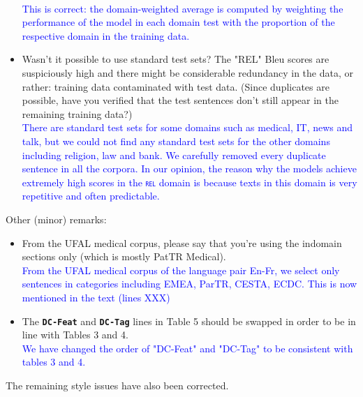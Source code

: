 \documentclass[12pt,times,a4paper,twoside]{article}
\newcommand{\fyTodo}[1]{\Todo[FY:]{\textcolor{orange}{#1}}}
\theoremstyle{definition}
\newcommand{\domain}[1]{\texttt{\textsc{#1}}}
\newcommand{\system}[1]{\texttt{\textbf{#1}}}
\begin{document}
\begin{itemize}
\\
\textcolor{blue}{This is correct: the domain-weighted average is computed by weighting the performance of the model in each domain test with the proportion of the respective domain in the training data.}
\\
\item Wasn't it possible to use standard test sets? The "REL" Bleu scores are suspiciously high and there might be considerable redundancy in the data, or rather: training data contaminated with test data. (Since duplicates are possible, have you verified that the test sentences don't still appear in the remaining training data?)
\\
\textcolor{blue}{There are standard test sets for some domains such as medical, IT, news and talk, but we could not find any standard test sets for the other domains including religion, law and bank. We carefully removed every duplicate sentence in all the corpora. In our opinion, the reason why the models achieve extremely high scores in the \domain{rel} domain is because texts in this domain is very repetitive and often predictable.}\fyTodo{sentence length ?, diversity index of vocab ?}
\end{itemize}

Other (minor) remarks:

\begin{itemize}
\item From the UFAL medical corpus, please say that you're using the indomain sections only (which is mostly PatTR Medical).
\\
\textcolor{blue}{From the UFAL medical corpus of the language pair En-Fr, we select only sentences in categories including EMEA, ParTR, CESTA, ECDC. This is now mentioned in the text (lines XXX)}\fyTodo{Add lines num}
\\
\item The \system{DC-Feat} and \system{DC-Tag} lines in Table 5 should be swapped in order to be in line with Tables 3 and 4.
  \\
  \textcolor{blue}{We have changed the order of "DC-Feat" and "DC-Tag" to be consistent with tables 3 and 4.}
\end{itemize}

The remaining style issues have also been corrected.



\end{document}

